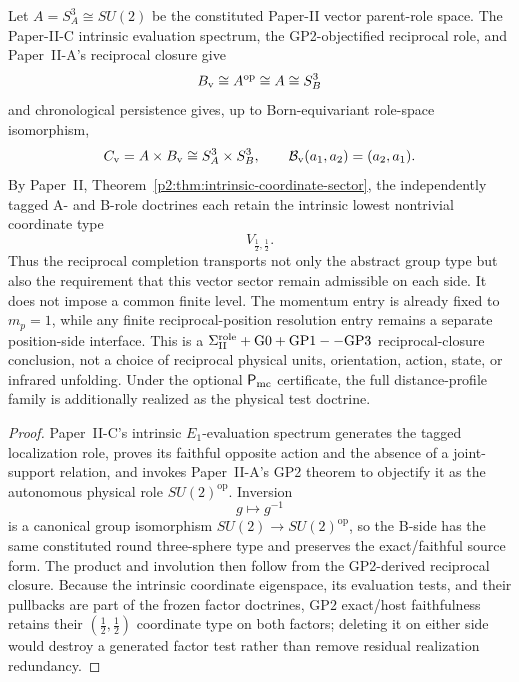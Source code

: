 \documentclass[12pt,a4paper]{article}
\begin{document}
\begin{theorem}
\label{p3:thm:born-reciprocity-exhaustion}
Let \(A=S^3_A\cong SU(2)\) be the constituted Paper-II vector parent-role space.
The Paper-II-C intrinsic evaluation spectrum, the GP2-objectified reciprocal
role, and Paper~II-A's reciprocal closure give
\[
        B_{\rm v}\cong A^{\mathrm{op}}\cong A\cong S^3_B
\]
and chronological persistence gives, up to Born-equivariant role-space isomorphism,
\[
        C_{\rm v}
        =A\times B_{\rm v}
        \cong S^3_A\times S^3_B,
        \qquad
        \mathcal B_{\rm v}(a_1,a_2)=(a_2,a_1).
\]
By Paper~II, Theorem~\ref{p2:thm:intrinsic-coordinate-sector}, the
independently tagged A- and B-role doctrines each retain the intrinsic lowest
nontrivial coordinate type
\[
        V_{\frac12,\frac12}.
\]
Thus the reciprocal completion transports not only the abstract group type
but also the requirement that this vector sector remain admissible on each
side.  It does not impose a common finite level.  The momentum entry is already fixed to \(m_p=1\), while any finite reciprocal-position resolution entry remains a separate position-side interface.
This is a
\(\Sigma_{\rm II}^{\rm role}+\mathrm{G0}+\mathrm{GP1--GP3}\)
reciprocal-closure conclusion, not a choice of reciprocal
physical units, orientation, action, state, or infrared unfolding.
Under the optional \(\mathsf P_{\rm mc}\) certificate, the full
distance-profile family is additionally realized as the physical test
doctrine.
\end{theorem}

\begin{proof}
Paper~II-C's intrinsic \(E_1\)-evaluation spectrum generates the tagged
localization role, proves its faithful opposite action and the absence of a
joint-support relation, and invokes Paper~II-A's GP2 theorem to objectify it as
the autonomous physical role \(SU(2)^{\mathrm{op}}\).  Inversion
\[
        g\longmapsto g^{-1}
\]
is a canonical group isomorphism
\(SU(2)\to SU(2)^{\mathrm{op}}\), so the B-side has the same constituted round
three-sphere type and preserves the exact/faithful source form.  The product
and involution then follow from the GP2-derived reciprocal closure.
Because the intrinsic coordinate eigenspace, its evaluation tests, and their
pullbacks are part of the frozen factor doctrines, GP2 exact/host faithfulness retains their
\((\frac12,\frac12)\) coordinate type on both factors; deleting it on either
side would destroy a generated factor test rather than remove residual realization redundancy.
\end{proof}
\end{document}
